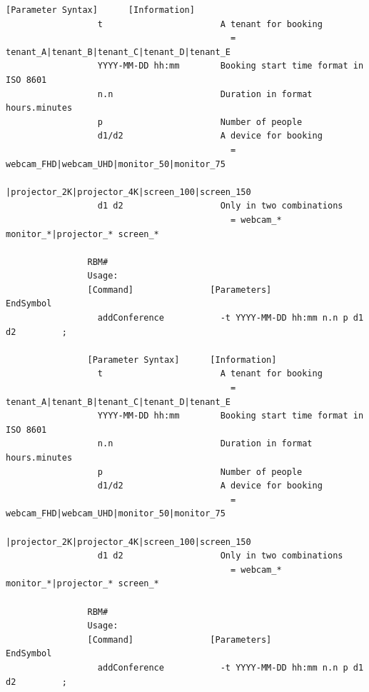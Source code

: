 \documentclass{article}
\begin{document}
\begin{Verbatim}[gobble=8]
                [Parameter Syntax]      [Information]                                         
                  t                       A tenant for booking                                
                                            = tenant_A|tenant_B|tenant_C|tenant_D|tenant_E    
                  YYYY-MM-DD hh:mm        Booking start time format in ISO 8601               
                  n.n                     Duration in format hours.minutes                    
                  p                       Number of people                                    
                  d1/d2                   A device for booking                                
                                            = webcam_FHD|webcam_UHD|monitor_50|monitor_75     
                                              |projector_2K|projector_4K|screen_100|screen_150
                  d1 d2                   Only in two combinations                            
                                            = webcam_* monitor_*|projector_* screen_*         
                
                RBM# 
                Usage: 
                [Command]               [Parameters]                            EndSymbol     
                  addConference           -t YYYY-MM-DD hh:mm n.n p d1 d2         ;           
                
                [Parameter Syntax]      [Information]                                         
                  t                       A tenant for booking                                
                                            = tenant_A|tenant_B|tenant_C|tenant_D|tenant_E    
                  YYYY-MM-DD hh:mm        Booking start time format in ISO 8601               
                  n.n                     Duration in format hours.minutes                    
                  p                       Number of people                                    
                  d1/d2                   A device for booking                                
                                            = webcam_FHD|webcam_UHD|monitor_50|monitor_75     
                                              |projector_2K|projector_4K|screen_100|screen_150
                  d1 d2                   Only in two combinations                            
                                            = webcam_* monitor_*|projector_* screen_*         
                
                RBM#
                Usage: 
                [Command]               [Parameters]                            EndSymbol     
                  addConference           -t YYYY-MM-DD hh:mm n.n p d1 d2         ;           
                

\end{Verbatim}
\end{document}
